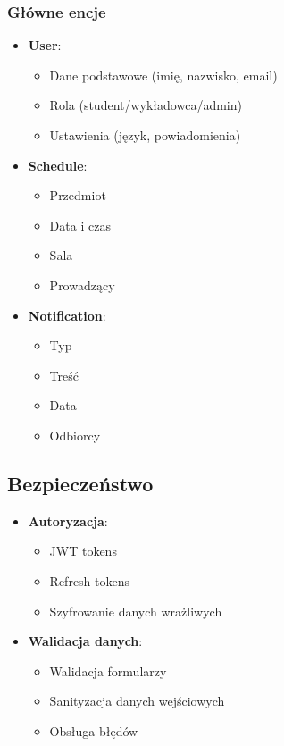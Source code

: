 \subsubsection{Główne encje}
\begin{itemize}
	\item \textbf{User}:
	      \begin{itemize}
		      \item Dane podstawowe (imię, nazwisko, email)
		      \item Rola (student/wykładowca/admin)
		      \item Ustawienia (język, powiadomienia)
	      \end{itemize}

	\item \textbf{Schedule}:
	      \begin{itemize}
		      \item Przedmiot
		      \item Data i czas
		      \item Sala
		      \item Prowadzący
	      \end{itemize}

	\item \textbf{Notification}:
	      \begin{itemize}
		      \item Typ
		      \item Treść
		      \item Data
		      \item Odbiorcy
	      \end{itemize}
\end{itemize}

\subsection{Bezpieczeństwo}

\begin{itemize}
	\item \textbf{Autoryzacja}:
	      \begin{itemize}
		      \item JWT tokens
		      \item Refresh tokens
		      \item Szyfrowanie danych wrażliwych
	      \end{itemize}

	\item \textbf{Walidacja danych}:
	      \begin{itemize}
		      \item Walidacja formularzy
		      \item Sanityzacja danych wejściowych
		      \item Obsługa błędów
	      \end{itemize}
\end{itemize}


